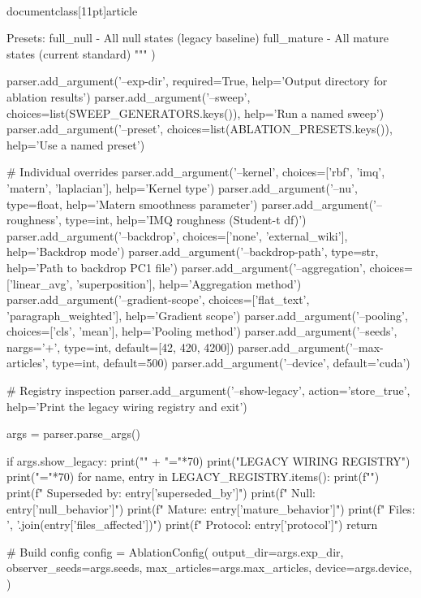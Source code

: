 \\documentclass[11pt]{article}
\begin{document}
\begin{CodeBlock}
Presets:
  full_null    - All null states (legacy baseline)
  full_mature  - All mature states (current standard)
        """
    )

    parser.add_argument('--exp-dir', required=True, help='Output directory for ablation results')
    parser.add_argument('--sweep', choices=list(SWEEP_GENERATORS.keys()),
                        help='Run a named sweep')
    parser.add_argument('--preset', choices=list(ABLATION_PRESETS.keys()),
                        help='Use a named preset')

    # Individual overrides
    parser.add_argument('--kernel', choices=['rbf', 'imq', 'matern', 'laplacian'],
                        help='Kernel type')
    parser.add_argument('--nu', type=float, help='Matern smoothness parameter')
    parser.add_argument('--roughness', type=int, help='IMQ roughness (Student-t df)')
    parser.add_argument('--backdrop', choices=['none', 'external_wiki'],
                        help='Backdrop mode')
    parser.add_argument('--backdrop-path', type=str, help='Path to backdrop PC1 file')
    parser.add_argument('--aggregation', choices=['linear_avg', 'superposition'],
                        help='Aggregation method')
    parser.add_argument('--gradient-scope', choices=['flat_text', 'paragraph_weighted'],
                        help='Gradient scope')
    parser.add_argument('--pooling', choices=['cls', 'mean'], help='Pooling method')
    parser.add_argument('--seeds', nargs='+', type=int, default=[42, 420, 4200])
    parser.add_argument('--max-articles', type=int, default=500)
    parser.add_argument('--device', default='cuda')

    # Registry inspection
    parser.add_argument('--show-legacy', action='store_true',
                        help='Print the legacy wiring registry and exit')

    args = parser.parse_args()

    if args.show_legacy:
        print("\n" + "="*70)
        print("LEGACY WIRING REGISTRY")
        print("="*70)
        for name, entry in LEGACY_REGISTRY.items():
            print(f"")
            print(f"  Superseded by: {entry['superseded_by']}")
            print(f"  Null:   {entry['null_behavior']}")
            print(f"  Mature: {entry['mature_behavior']}")
            print(f"  Files:  {', '.join(entry['files_affected'])}")
            print(f"  Protocol: {entry['protocol']}")
        return

    # Build config
    config = AblationConfig(
        output_dir=args.exp_dir,
        observer_seeds=args.seeds,
        max_articles=args.max_articles,
        device=args.device,
    )


\end{CodeBlock}
\end{document}

